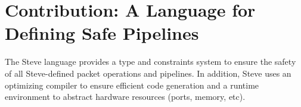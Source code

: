 %
%
%
%
%

\section{Contribution: A Language for Defining Safe Pipelines}

The Steve language provides a type and constraints system to ensure the safety
of all Steve-defined packet operations and pipelines.
In addition, Steve uses an optimizing compiler to ensure efficient code generation
and a runtime environment to abstract hardware resources (ports, memory, etc).

